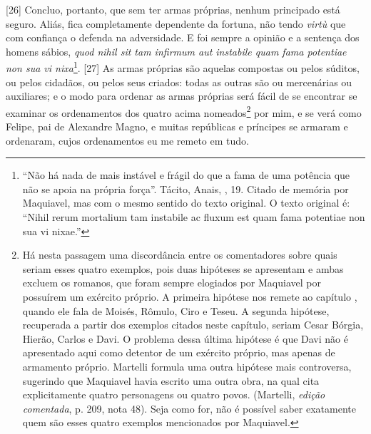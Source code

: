 {[}26{]} Concluo, portanto, que sem ter armas próprias, nenhum
principado está seguro. Aliás, fica completamente dependente da fortuna,
não tendo \emph{virtù} que com confiança o defenda na adversidade. E foi
sempre a opinião e a sentença dos homens sábios, \emph{quod nihil sit
tam infirmum aut instabile quam fama potentiae non sua vi
nixa}\footnote{``Não há nada de mais instável e frágil do que a fama de
  uma potência que não se apoia na própria força''. Tácito, Anais, ,
  19. Citado de memória por Maquiavel, mas com o mesmo sentido do texto
  original. O texto original é: ``Nihil rerum mortalium tam instabile ac
  fluxum est quam fama potentiae non sua vi nixae.''}. {[}27{]} As armas
próprias são aquelas compostas ou pelos súditos, ou pelos cidadãos, ou
pelos seus criados: todas as outras são ou mercenárias ou auxiliares; e
o modo para ordenar as armas próprias será fácil de se encontrar se
examinar os ordenamentos dos quatro acima nomeados\footnote{Há nesta
  passagem uma discordância entre os comentadores sobre quais seriam
  esses quatro exemplos, pois duas hipóteses se apresentam e ambas
  excluem os romanos, que foram sempre elogiados por Maquiavel por
  possuírem um exército próprio. A primeira hipótese nos remete ao
  capítulo , quando ele fala de Moisés, Rômulo, Ciro e Teseu. A
  segunda hipótese, recuperada a partir dos exemplos citados neste
  capítulo, seriam Cesar Bórgia, Hierão, Carlos  e Davi. O problema
  dessa última hipótese é que Davi não é apresentado aqui como detentor
  de um exército próprio, mas apenas de armamento próprio. Martelli
  formula uma outra hipótese mais controversa, sugerindo que Maquiavel
  havia escrito uma outra obra, na qual cita explicitamente quatro
  personagens ou quatro povos. (Martelli, \emph{edição comentada}, p.
  209, nota 48). Seja como for, não é possível saber exatamente quem são
  esses quatro exemplos mencionados por Maquiavel.} por mim, e se verá
como Felipe, pai de Alexandre Magno, e muitas repúblicas e príncipes se
armaram e ordenaram, cujos ordenamentos eu me remeto em tudo.


